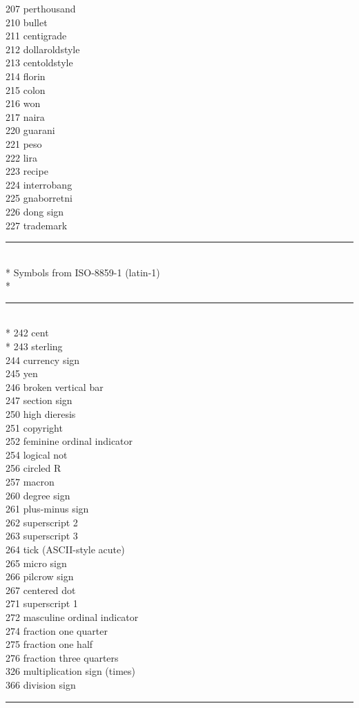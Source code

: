 \documentclass{article}
\renewcommand{\-}{\discretionary{\char'0177 }{}{}}
\begin{document}
\begin{tabbing}
207 \> perthousand\\
210 \> bullet   \\
211 \> centigrade  \\
212 \> dollaroldstyle\\
213 \> centoldstyle\\
214 \> florin   \\
215 \> colon    \\
216 \> won      \\
217 \> naira    \\
220 \> guarani  \\
221 \> peso     \\
222 \> lira     \\
223 \> recipe   \\
224 \> interrobang \\
225 \> gnaborretni \\
226 \> dong sign \\ %
227 \> trademark \\
\rule{\linewidth}{.4pt}\>\\*
Symbols from ISO-8859-1 (latin-1)\>\\*
\rule{\linewidth}{.4pt}\>\\*
242 \> cent \\*
243 \> sterling \\
244 \> currency sign \\
245 \> yen \\
246 \> broken vertical bar \\
247 \> section sign \\
250 \> high dieresis\\
251 \> copyright \\
252 \> feminine ordinal indicator \\
254 \> logical not \\
256 \> circled R \\
257 \> macron\\
260 \> degree sign \\
261 \> plus-minus sign \\
262 \> superscript 2 \\
263 \> superscript 3 \\
264 \> tick (ASCII-style acute) \\
265 \> micro sign \\
266 \> pilcrow sign \\
267 \> centered dot \\
271 \> superscript 1\\
272 \> masculine ordinal indicator\\
274 \> fraction one quarter\\
275 \> fraction one half   \\
276 \> fraction three quarters\\
326 \> multiplication sign (times) \\ %
366 \> division sign \\               %
\rule{\linewidth}{.4pt}\>\\
\end{tabbing}
\end{document}

